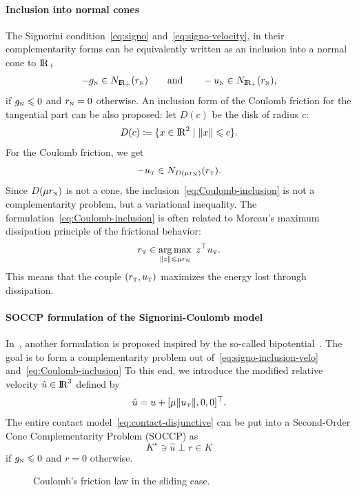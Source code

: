 {\paragraph{Inclusion into normal cones} The Signorini condition~\eqref{eq:signo} and~\eqref{eq:signo-velocity}, in their complementarity forms can be equivalently written  as an inclusion into a normal cone to $\mathrm{I\!R}_+$
\begin{equation}
 - g_\n \in N_{\RR_+}(r_\n)\qquad\text{and}\qquad
  - u_\n \in N_{\RR_+}(r_\n),
  \label{eq:signo-inclusion-velo}
\end{equation}
if $g_{{\hbox{\tiny{N}}}} \leqslant 0$ and $r_{\hbox{\tiny{N}}} =0 $ otherwise. An inclusion form of the Coulomb friction {for the tangential part} can be also proposed: let $D(c)$ be the disk of radius $c$:
\begin{equation}
  \label{eq:diskR}
  D(c) \coloneqq \{x\in \RR^2\mid \|x\| \leq c \}.
\end{equation}
For the Coulomb friction, we get
\begin{equation}
  \label{eq:Coulomb-inclusion}
  - u_{\t} \in N_{D(\mu r_\n)}(r_{\t}).
\end{equation}
Since $D(\mu r_{\hbox{\tiny{N}}})$ is not a cone, the inclusion~\eqref{eq:Coulomb-inclusion} is not a complementarity problem, but a variational inequality.
The formulation~\eqref{eq:Coulomb-inclusion} is often related to Moreau's maximum dissipation principle of the frictional behavior:
\begin{equation}
  \label{eq:moreau-maxprinciple}
  r_\t \in \argmax_{\|z\| \leq \mu r_\n}\;  z^\top u_\t.
\end{equation}
This means that the couple $(r_{\hbox{\tiny{T}}},u_{\hbox{\tiny{T}}})$ maximizes the energy lost through dissipation.


\paragraph{SOCCP formulation of the Signorini-Coulomb model}

In~\cite{Acary.Brogliato2008,Acary.ea_ZAMM2011}, another formulation is proposed inspired by the so-called bipotential~\cite{DeSaxce92,DeSaxce.Feng90,DeSaxce.Feng_MCM1998}.
{The goal is to form a complementarity problem out of~\eqref{eq:signo-inclusion-velo} and~\eqref{eq:Coulomb-inclusion}}
To this end, we introduce the modified relative velocity $\hat u \in \mathrm{I\!R}^3$ defined by
\begin{equation}
  \label{eq:modified-velocity}
  \hat u = u + [\mu \|u_\t\|, 0, 0]^\top.
\end{equation}
The entire contact model~\eqref{eq:contact-disjunctive} can be put into a Second-Order Cone Complementarity Problem (SOCCP) as
\begin{equation}
  \label{eq:contact-SOCCP}
 K^\star \ni \hat u \perp r \in K
\end{equation}
 if $ g_{\hbox{\tiny{N}}} \leqslant 0 $ and $r=0$ otherwise. 
\begin{figure}\centering
  \resizebox{!}{0.5\textheight}{}
  \caption{Coulomb's friction law in the sliding case.}
\label{fig:CoulombLawSliding}
\end{figure}

}
